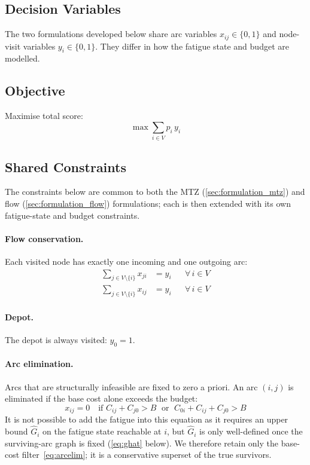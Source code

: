 \documentclass[11pt,a4paper]{article}
\begin{document}
\subsection{Decision Variables}

The two formulations developed below share arc variables $x_{ij} \in \{0,1\}$ and node-visit variables $y_i \in \{0,1\}$.
They differ in how the fatigue state and budget are modelled.

\subsection{Objective}

Maximise total score:
\begin{equation}
  \max \sum_{i \in V} p_i \, y_i
  \label{eq:obj}
\end{equation}

\subsection{Shared Constraints}

The constraints below are common to both the MTZ (\cref{sec:formulation_mtz}) and flow (\cref{sec:formulation_flow}) formulations; each is then extended with its own fatigue-state and budget constraints.

\paragraph{Flow conservation.}
Each visited node has exactly one incoming and one outgoing arc:
\begin{align}
  \sum_{j \in V \setminus \{i\}} x_{ji} &= y_i && \forall\, i \in V \label{eq:inflow} \\
  \sum_{j \in V \setminus \{i\}} x_{ij} &= y_i && \forall\, i \in V \label{eq:outflow}
\end{align}

\paragraph{Depot.}
The depot is always visited: $y_0 = 1$.

\paragraph{Arc elimination.}
Arcs that are structurally infeasible are fixed to zero a priori.
An arc $(i,j)$ is eliminated if the base cost alone exceeds the budget:
\begin{equation}
  x_{ij} = 0 \quad \text{if } C_{ij} + C_{j0} > B \;\text{ or }\; C_{0i} + C_{ij} + C_{j0} > B
  \label{eq:arcelim}
\end{equation}
It is not possible to add the fatigue into this equation as it requires an upper bound $\hat{G}_i$ on the fatigue state reachable at $i$, but $\hat{G}_i$ is only well-defined once the surviving-arc graph is fixed (\cref{eq:ghat} below).
We therefore retain only the base-cost filter~\eqref{eq:arcelim}; it is a conservative superset of the true survivors.
\end{document}
